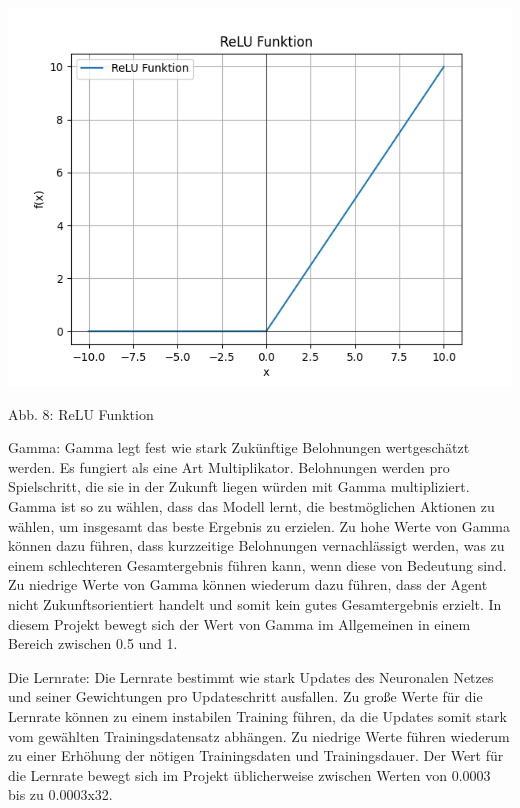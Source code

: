 \begin{minipage}{\linewidth}
	\vspace{0.5cm}
	\includegraphics[width=1\textwidth]{Bilder/ReLU.png}
	
	Abb. 8: ReLU Funktion \\
\end{minipage}

Gamma: Gamma legt fest wie stark Zukünftige Belohnungen wertgeschätzt werden. Es fungiert als eine Art Multiplikator. Belohnungen werden pro Spielschritt, die sie in der Zukunft liegen würden mit Gamma multipliziert. Gamma ist so zu wählen, dass das Modell lernt, die bestmöglichen Aktionen zu wählen, um insgesamt das beste Ergebnis zu erzielen. Zu hohe Werte von Gamma können dazu führen, dass kurzzeitige Belohnungen vernachlässigt werden, was zu einem schlechteren Gesamtergebnis führen kann, wenn diese von Bedeutung sind. Zu niedrige Werte von Gamma können wiederum dazu führen, dass der Agent nicht Zukunftsorientiert handelt und somit kein gutes Gesamtergebnis erzielt. In diesem Projekt bewegt sich der Wert von Gamma im Allgemeinen in einem Bereich zwischen 0.5 und 1.

Die Lernrate: Die Lernrate bestimmt wie stark Updates des Neuronalen Netzes und seiner Gewichtungen pro Updateschritt ausfallen. Zu große Werte für die Lernrate können zu einem instabilen Training führen, da die Updates somit stark vom gewählten Trainingsdatensatz abhängen. Zu niedrige Werte führen wiederum zu einer Erhöhung der nötigen Trainingsdaten und Trainingsdauer. Der Wert für die Lernrate bewegt sich im Projekt üblicherweise zwischen Werten von 0.0003 bis zu 0.0003x32.

